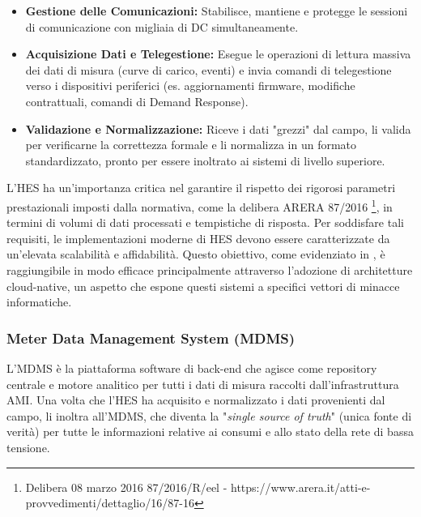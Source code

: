 \begin{itemize}
    \item \textbf{Gestione delle Comunicazioni:} Stabilisce, mantiene e protegge le sessioni di comunicazione con migliaia di DC simultaneamente.
    \item \textbf{Acquisizione Dati e Telegestione:} Esegue le operazioni di lettura massiva dei dati di misura (curve di carico, eventi) e invia comandi di telegestione verso i dispositivi periferici (es. aggiornamenti firmware, modifiche contrattuali, comandi di Demand Response).
    \item \textbf{Validazione e Normalizzazione:} Riceve i dati "grezzi" dal campo, li valida per verificarne la correttezza formale e li normalizza in un formato standardizzato, pronto per essere inoltrato ai sistemi di livello superiore.
\end{itemize}


L'HES ha un'importanza critica nel garantire il rispetto dei rigorosi parametri prestazionali imposti dalla normativa, come la delibera ARERA 87/2016 \footnote{Delibera 08 marzo 2016 87/2016/R/eel - https://www.arera.it/atti-e-provvedimenti/dettaglio/16/87-16}, in termini di volumi di dati processati e tempistiche di risposta. Per soddisfare tali requisiti, le implementazioni moderne di HES devono essere caratterizzate da un'elevata scalabilità e affidabilità. Questo obiettivo, come evidenziato in \cite{chian2-e-dist-2017}, è raggiungibile in modo efficace principalmente attraverso l'adozione di architetture cloud-native, un aspetto che espone questi sistemi a specifici vettori di minacce informatiche.


\subsubsection{Meter Data Management System (MDMS)}



L'MDMS è la piattaforma software di back-end che agisce come repository centrale e motore analitico per tutti i dati di misura raccolti dall'infrastruttura AMI. Una volta che l'HES ha acquisito e normalizzato i dati provenienti dal campo, li inoltra all'MDMS, che diventa la "\textit{single source of truth}" (unica fonte di verità) per tutte le informazioni relative ai consumi e allo stato della rete di bassa tensione.


